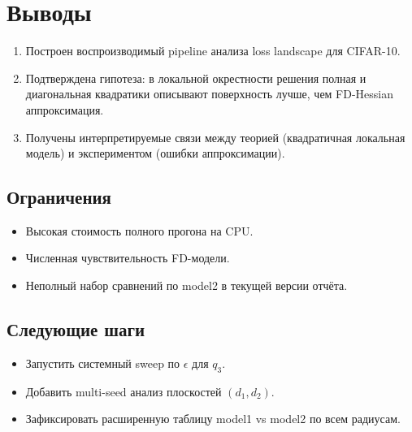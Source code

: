 \section{Выводы}

\begin{enumerate}
    \item Построен воспроизводимый pipeline анализа loss landscape для CIFAR-10.
    \item Подтверждена гипотеза: в локальной окрестности решения полная и диагональная квадратики описывают поверхность лучше, чем FD-Hessian аппроксимация.
    \item Получены интерпретируемые связи между теорией (квадратичная локальная модель) и экспериментом (ошибки аппроксимации).
\end{enumerate}

\subsection{Ограничения}
\begin{itemize}
    \item Высокая стоимость полного прогона на CPU.
    \item Численная чувствительность FD-модели.
    \item Неполный набор сравнений по model2 в текущей версии отчёта.
\end{itemize}

\subsection{Следующие шаги}
\begin{itemize}
    \item Запустить системный sweep по $\epsilon$ для $q_3$.
    \item Добавить multi-seed анализ плоскостей $(d_1, d_2)$.
    \item Зафиксировать расширенную таблицу model1 vs model2 по всем радиусам.
\end{itemize}
